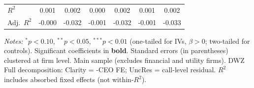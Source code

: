 \documentclass[11pt,a4paper]{article}
\begin{document}
\begin{table}[htbp]
\begin{tabular}{lcccccc}
$R^2$ & 0.001 & 0.002 & 0.000 & 0.002 & 0.001 & 0.002 \\
Adj.~$R^2$ & -0.000 & -0.032 & -0.001 & -0.032 & -0.001 & -0.033 \\
\bottomrule
\end{tabular}
\begin{minipage}{\linewidth}
\vspace{2pt}\scriptsize
\textit{Notes:} $^{*}p<0.10$, $^{**}p<0.05$, $^{***}p<0.01$ (one-tailed for IVs, $\beta > 0$; two-tailed for controls).
 Significant coefficients in \textbf{bold}.
 Standard errors (in parentheses) clustered at firm level.
 Main sample (excludes financial and utility firms). DWZ Full decomposition: Clarity = -CEO FE; UncRes = call-level residual.
 $R^2$ includes absorbed fixed effects (not within-$R^2$).
\end{minipage}
\end{table}
\clearpage

\clearpage

\clearpage

\clearpage

\end{document}
